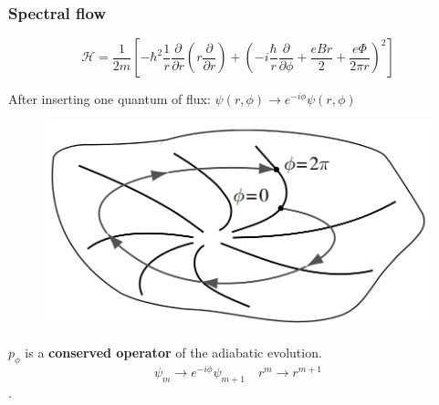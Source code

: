\documentclass{beamer}
\begin{document}
\begin{frame}
\frametitle{Spectral flow}
\begin{center}

\[
\mathcal{H} = \frac{1}{2 m} \left[ -\hbar^2 \frac{1}{r} \frac{\partial}{\partial r} \left( r \frac{\partial}{\partial r} \right)  + \left( -i \frac{\hbar}{r} \frac{\partial }{\partial \phi} + \frac{e B r}{2} + \frac{e \Phi }{2 \pi r} \right)^2 \right]
\]

After inserting one quantum of flux: $\psi (r, \phi) \rightarrow e^{- i \phi} \psi \left( r, \phi \right)$


\begin{figure}[!htb]
\centering
\includegraphics[scale=0.20]{spectralFlow.png}
\end{figure}

$p_{\phi}$ is a \textbf{conserved operator} of the adiabatic evolution.
\[ \psi_m \rightarrow e^{-i \phi} \psi_{m+1} \quad r^m \rightarrow r^{m+1}\].

\end{center}
\end{frame}
\end{document}
